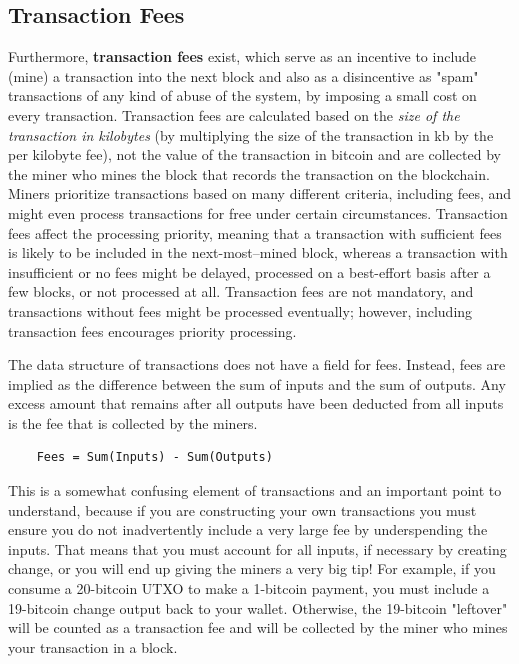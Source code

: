 \documentclass{article}
\begin{document}
  \subsection{Transaction Fees}

    Furthermore, \textbf{transaction fees} exist, which serve as an incentive to include (mine) a transaction into the next block and also as a disincentive as "spam" transactions of any kind of abuse of the system, by imposing a small cost on every transaction. Transaction fees are calculated based on the \textit{size of the transaction in kilobytes} (by multiplying the size of the transaction in kb by the per kilobyte fee), not the value of the transaction in bitcoin and are collected by the miner who mines the block that records the transaction on the blockchain. Miners prioritize transactions based on many different criteria, including fees, and might even process transactions for free under certain circumstances. Transaction fees affect the processing priority, meaning that a transaction with sufficient fees is likely to be included in the next-most–mined block, whereas a transaction with insufficient or no fees might be delayed, processed on a best-effort basis after a few blocks, or not processed at all. Transaction fees are not mandatory, and transactions without fees might be processed eventually; however, including transaction fees encourages priority processing.

    The data structure of transactions does not have a field for fees. Instead, fees are implied as the difference between the sum of inputs and the sum of outputs. Any excess amount that remains after all outputs have been deducted from all inputs is the fee that is collected by the miners.

    \begin{lstlisting}
    Fees = Sum(Inputs) - Sum(Outputs)
    \end{lstlisting}

    This is a somewhat confusing element of transactions and an important point to understand, because if you are constructing your own transactions you must ensure you do not inadvertently include a very large fee by underspending the inputs. That means that you must account for all inputs, if necessary by creating change, or you will end up giving the miners a very big tip! For example, if you consume a 20-bitcoin UTXO to make a 1-bitcoin payment, you must include a 19-bitcoin change output back to your wallet. Otherwise, the 19-bitcoin "leftover" will be counted as a transaction fee and will be collected by the miner who mines your transaction in a block.
\end{document}

